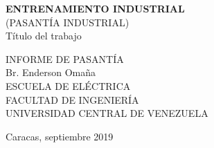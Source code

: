 \thispagestyle{empty} 
\begin{center}
    \textbf{ENTRENAMIENTO INDUSTRIAL}\\
    (PASANTÍA INDUSTRIAL)\\

    \vspace{5cm}
    Título del trabajo
\end{center}    
    \vspace{5cm}
    \hspace{6cm}INFORME DE PASANTÍA\\
    \hspace{6cm}Br. Enderson Omaña\\
    \hspace{6cm}ESCUELA DE ELÉCTRICA\\
    \hspace{6cm}FACULTAD DE INGENIERÍA\\
    \hspace{6cm}UNIVERSIDAD CENTRAL DE VENEZUELA\\
    \vspace{5cm}
    \begin{center}
        Caracas, septiembre 2019
    \end{center}